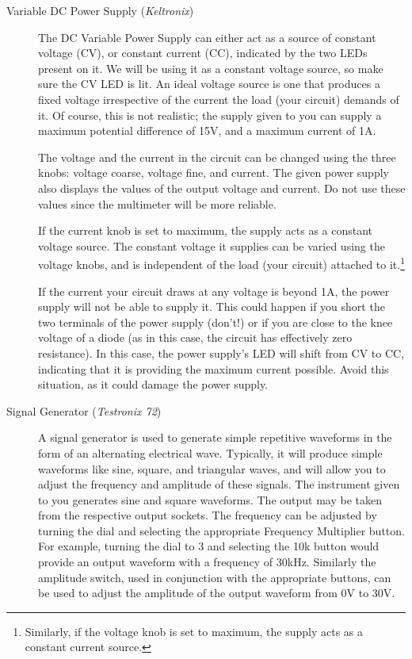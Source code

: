 \begin{refsection}
\begin{description}
\item[Variable DC Power Supply (\textit{Keltronix})]

The DC Variable Power Supply can either act as a source of constant voltage (CV), or constant current (CC), indicated by the two LEDs present on it. We will be using it as a constant voltage source, so make sure the CV LED is lit. An ideal voltage source is one that produces a fixed voltage irrespective of the current the load (your circuit) demands of it. Of course, this is not realistic; the supply given to you can supply a maximum potential difference of 15V, and a maximum current of 1A.

The voltage and the current in the circuit can be changed using the three knobs: voltage coarse, voltage fine, and current. The given power supply also displays the values of the output voltage and current. Do not use these values since the multimeter will be more reliable. 

If the current knob is set to maximum, the supply acts as a constant voltage source. The constant voltage it supplies can be varied using the voltage knobs, and is independent of the load (your circuit) attached to it.\footnote{Similarly, if the voltage knob is set to maximum, the supply acts as a constant current source.}

\begin{imp}
If the current your circuit draws at any voltage is beyond 1A, the power supply will not be able to supply it. This could happen if you short the two terminals of the power supply (don't!) or if you are close to the knee voltage of a diode (as in this case, the circuit has effectively zero resistance). In this case, the power supply's LED will shift from CV to CC, indicating that it is providing the maximum current possible. Avoid this situation, as it could damage the power supply.
\end{imp}

\item[Signal Generator (\textit{Testronix 72})]

A signal generator is used to generate simple repetitive waveforms in the form of an alternating electrical wave. Typically, it will produce simple waveforms like sine, square, and triangular waves, and will allow you to adjust the frequency and amplitude of these signals. The instrument given to you generates sine and square waveforms. The output may be taken from the respective output sockets. The frequency can be adjusted by turning the dial and selecting the appropriate Frequency Multiplier button. For example, turning the dial to 3 and selecting the 10k button would provide an output waveform with a frequency of 30kHz. Similarly the amplitude switch, used in conjunction with the appropriate buttons, can be used to adjust the amplitude of the output waveform from 0V to 30V.


\end{description}
\end{refsection}

